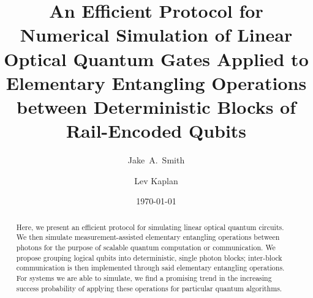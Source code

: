 \documentclass[aps,pra,twocolumn,showpacs,superscriptaddress,floatfix,10pt]{revtex4}
\begin{document}
\newcommand{\beq}{\begin{equation}}
\newcommand{\eeq}{\end{equation}}
\newcommand{\ben}{\begin{eqnarray}}
\newcommand{\een}{\end{eqnarray}}
\newcommand{\bea}{\begin{array}}
\newcommand{\eea}{\end{array}}
\newcommand{\om}{(\omega )}
\newcommand{\bef}{\begin{figure}}
\newcommand{\eef}{\end{figure}}
\newcommand{\leg}[1]{\caption{\protect\rm{\protect\footnotesize{#1}}}}
\newcommand{\ew}[1]{\langle{#1}\rangle}
\newcommand{\be}[1]{\mid\!{#1}\!\mid}
\newcommand{\no}{\nonumber}
\newcommand{\etal}{{\em et~al }}
\newcommand{\geff}{g_{\mbox{\it{\scriptsize{eff}}}}}
\newcommand{\da}[1]{{#1}^\dagger}
\newcommand{\cf}{{\it cf.\/}\ }
\newcommand{\ie}{{\it i.e.\/}\ }   

\newcommand{\spazio}{\vspace{0.3cm}}%
\newcommand{\de}[1]{\frac{\partial}{\partial{#1}}}
\newcommand{\U}{\tilde{U}}
\newcommand{\V}{\tilde{V}}


\title{An Efficient Protocol for Numerical Simulation of Linear Optical Quantum Gates Applied to Elementary Entangling Operations between Deterministic Blocks of Rail-Encoded Qubits}

\author{Jake~A.~Smith}

\author{Lev Kaplan}

 \begin{abstract}
Here, we present an efficient protocol for simulating linear optical quantum circuits. We then simulate measurement-assisted elementary entangling operations between photons for the purpose of scalable quantum computation or communication. We propose grouping logical qubits into deterministic, single photon blocks; inter-block communication is then implemented through said elementary entangling operations. For systems we are able to simulate, we find a promising trend in the increasing success probability of applying these operations for particular quantum algorithms.
\end{abstract}                                                               
\date{\today}
\pacs{***}
\maketitle
\end{document}
